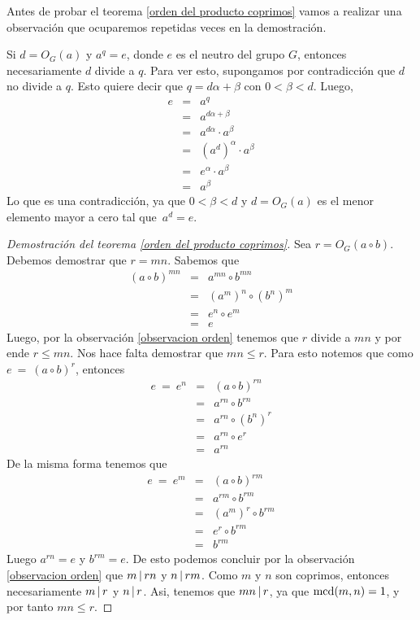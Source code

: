 Antes de probar el teorema \ref{orden del producto coprimos} vamos a realizar una observación que ocuparemos repetidas veces en la demostración.
\begin{observacion}
 Si $d=O_G(a)$ y $a^q =e$, donde $e$ es el neutro del grupo $G$, entonces necesariamente $d$ divide a $q$. Para ver esto, supongamos por contradicción que $d$ no divide a $q$. Esto quiere decir que $q = d\alpha + \beta$ con $0<\beta<d$. Luego, 
\begin{eqnarray*}
	e &=& a^q \\
	 &=&  a^{d\alpha  + \beta} \\ 
	 &=&  a^{d\alpha }\cdot a^{\beta}\\
	 &=&  (a^{d})^{\alpha }\cdot a^{\beta}\\
	 &=&  e^{\alpha}\cdot a^{\beta}\\
	 &=&  a^{\beta} 
\end{eqnarray*} 
Lo que es una contradicción, ya que $0<\beta < d$ y $d = O_G(a)$ es el menor elemento mayor a cero tal que~$a^d = e$.   
\end{observacion}
\begin{proof}[Demostración del teorema \ref{orden del producto coprimos}]
	Sea $r=O_G(a\circ b)$. Debemos demostrar que $r = mn$. Sabemos que 
	\begin{eqnarray*}
		(a\circ b)^{mn} &=& a^{mn}\circ b^{mn}\\
                &=& (a^m)^n\circ (b^n)^m\\
		&=&e^n\circ e^m \\
		 &=&  e
	\end{eqnarray*}
Luego, por la observación \ref{observacion orden} tenemos que $r$ divide a $mn$ y por ende $r\leq mn$. Nos hace falta demostrar que $mn\leq r$. Para esto notemos que como $e \ = \ (a\circ b)^r$, entonces
\begin{eqnarray*}
	 e \ = \ e^n & =&  (a\circ b)^{rn} \\
	 & = & a^{rn} \circ b^{rn}\\
	 & = & a^{rn} \circ (b^{n})^{r}\\
	 & = & a^{rn} \circ e^{r}\\
	 &=& a^{rn}
\end{eqnarray*}
 De la misma forma tenemos que
\begin{eqnarray*}
	 e \ = \ e^m & =&  (a\circ b)^{rm} \\
	 & = & a^{rm} \circ b^{rm}\\
	 & = & (a^{m})^r \circ b^{rm}\\
	 & = & e^{r} \circ b^{rm}\\
	 &=& b^{rm}
\end{eqnarray*}
Luego $a^{rn}=e$ y $b^{rm} = e$. De esto podemos concluir por la observación \ref{observacion orden} que $m \hspace{1.8pt}|\hspace{1.8pt} rn$ y $n\hspace{1.8pt}|\hspace{1.8pt} rm$. Como $m$ y $n$ son coprimos, entonces necesariamente $m \hspace{1.8pt}|\hspace{1.8pt} r$ y $n\hspace{1.8pt}|\hspace{1.8pt} r$. Asi, tenemos que $mn\hspace{1.8pt}|\hspace{1.8pt} r$, ya que ${\rm mcd}(m,n)=1$, y por tanto $mn\leq r$. 
\end{proof}

